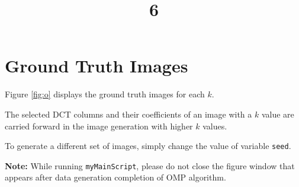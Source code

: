 \documentclass[a4paper, landscape]{article}
\title{6}
\date{}
\begin{document}
\maketitle
\section{Ground Truth Images}
Figure \ref{fig:o} displays the ground truth images for each $k$.

The selected DCT columns and their coefficients of an image with a $k$ value are carried forward in the image generation with higher $k$ values.

To generate a different set of images, simply change the value of variable \verb!seed!.

\textbf{Note:} While running \verb!myMainScript!, please do not close the figure window that appears after data generation completion of OMP algorithm.
\end{document}
